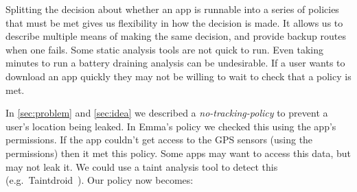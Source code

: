 \documentclass[]{llncs}
\begin{document}
%
%
%

Splitting the decision about whether an app is runnable into a series of policies that must be met gives us flexibility in how the decision is made.
It allows us to describe multiple means of making the same decision, and provide backup routes when one fails.
Some static analysis tools are not quick to run.
Even taking minutes to run a battery draining analysis can be undesirable.
If a user wants to download an app quickly they may not be willing to wait to check that a policy is met.

In \autoref{sec:problem} and \autoref{sec:idea} we described a \emph{no-tracking-policy} to prevent a user's location being leaked.
In Emma's policy we checked this using the app's permissions.
If the app couldn't get access to the GPS sensors (using the permissions) then it met this policy.
Some apps may want to access this data, but may not leak it.
We could use a taint analysis tool to detect this (e.g.~Taintdroid~\cite{Fritz:2013vi}).
Our policy now becomes:
\end{document}
